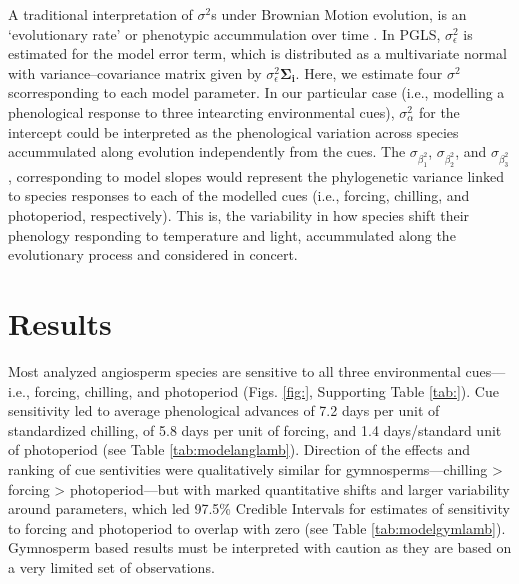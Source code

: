 \documentclass{article}\usepackage[]{graphicx}\usepackage[]{color}
\begin{document}
A traditional interpretation of $\sigma^2$s under Brownian Motion evolution, is an ‘evolutionary rate’ or phenotypic accummulation over time \citep{revell2008phylogenetic}. In PGLS, $\sigma_\epsilon^2$ is estimated for the model error term, which is distributed as a multivariate normal with variance–covariance matrix given by $\sigma_\epsilon^2$$\boldsymbol{\Sigma_i}$. Here, we estimate four $\sigma^2$scorresponding to each model parameter. In our particular case (i.e., modelling a phenological response to three intearcting environmental cues), $\sigma_\alpha^2$ for the intercept could be interpreted as the phenological variation across species accummulated along evolution independently from the cues. The $\sigma_\beta_1^2$, $\sigma_\beta_2^2$, and $\sigma_\beta_3^2$, corresponding to model slopes would represent the phylogenetic variance linked to species responses to each of the modelled cues (i.e., forcing, chilling, and photoperiod, respectively). This is, the variability in how species shift their phenology responding to temperature and light, accummulated along the evolutionary process and considered in concert. \\ 






\section*{Results}

Most analyzed angiosperm species are sensitive to all three environmental cues---i.e., forcing, chilling, and photoperiod (Figs. \ref{fig:}, Supporting Table \ref{tab:}). Cue sensitivity led to average phenological advances of 7.2 days per unit of standardized chilling, of 5.8 days per unit of forcing, and 1.4 days/standard unit of photoperiod (see Table \ref{tab:modelanglamb}). Direction of the effects and ranking of cue sentivities were qualitatively similar for gymnosperms---chilling > forcing > photoperiod---but with marked quantitative shifts and larger variability around parameters, which led 97.5\% Credible Intervals for estimates of sensitivity to forcing and photoperiod to overlap with zero (see Table \ref{tab:modelgymlamb}). Gymnosperm based results must be interpreted with caution as they are based on a very limited set of observations.\\ %
\end{document}
